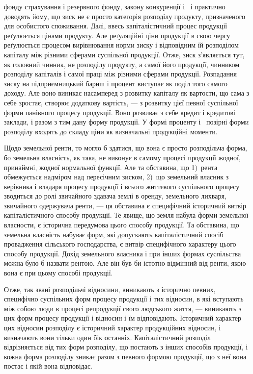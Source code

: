 \parcont{}  %
фонду страхування і резервного фонду, закону конкуренції і~ і практично
доводять йому, що зиск не є просто категорія розподілу продукту, призначеного
для особистого споживання. Далі, ввесь капіталістичний процес продукції реґулюється
цінами продукту. Але реґуляційні ціни продукції в свою чергу реґулюється
процесом вирівнювання норми зиску і відповідним їй розподілом капіталу
між різними сферами суспільної продукції. Отже, зиск з’являється тут, як головний
чинник, не розподілу продукту, а самої його продукції, чинником розподілу
капіталів і самої праці між різними сферами продукції. Розпадання зиску на
підприємницький бариш і процент виступає як поділ того самого доходу. Але воно
виникає насамперед з розвитку капіталу як вартости, що сама з себе зростає, створює
додаткову вартість, — з розвитку цієї певної суспільної форми панівного
процесу продукції. Воно розвиває з себе кредит і кредитові заклади, і разом з
тим дану форму продукції. У формі проценту і~ позірні форми розподілу
входять до складу ціни як визначальні продукційні моменти.

Щодо земельної ренти, то могло б здатися, що вона є просто розподільча
форма, бо земельна власність, як така, не виконує в самому процесі продукції
жодної, принаймні, жодної нормальної функції. Але та обставина, що 1)~рента
обмежується надміром над пересічним зиском, 2)~що земельний власник з керівника
і владаря процесу продукції і всього життєвого суспільного процесу зводиться
до ролі звичайного здавача землі в оренду, земельного лихваря, звичайного
одержувача ренти, — ця обставина є специфічний історичний витвір капіталістичного
способу продукції. Те явище, що земля набула форми земельної
власности, є історична передумова цього способу продукції. Та обставина, що
земельна власність набуває форм, які допускають капіталістичний спосіб провадження
сільського господарства, є витвір специфічного характеру цього способу
продукції. Дохід земельного власника і при інших формах суспільства
можна було б назвати рентою. Але він був би істотно відмінний від ренти,
якою вона є при цьому способі продукції.

Отже, так звані розподільчі відносини, виникають з історично певних,
специфічно суспільних форм процесу продукції і тих відносин, в які вступають
між собою люди в процесі репродукції свого людського життя, — виникають з цих
форм процесу продукції і відносин і їм відповідають. Історичний характер цих
відносин розподілу є історичний характер продукційних відносин, і визначають вони
тільки один бік останніх. Капіталістичний розподіл відрізняється від тих форм
розподілу, що постають з інших способів продукції, і кожна форма розподілу зникає
разом з певного формою продукції, що з неї вона постає і якій вона відповідає.

